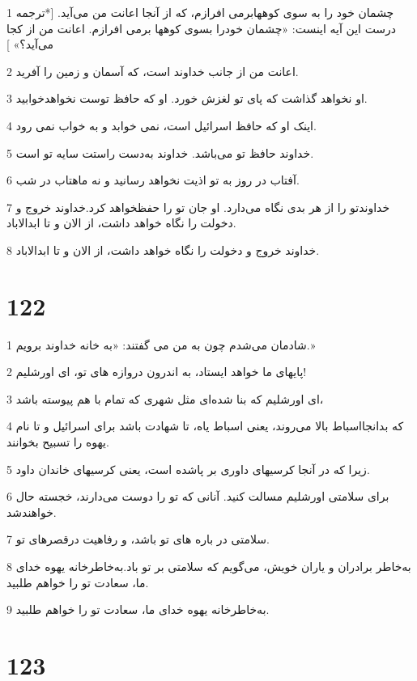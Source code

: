 \par 1 چشمان خود را به سوی کوههابرمی افرازم، که از آنجا اعانت من می‌آید. [*ترجمه درست این آیه اینست: «چشمان خودرا بسوی کوهها برمی افرازم. اعانت من از کجا می‌آید؟» ]
\par 2 اعانت من از جانب خداوند است، که آسمان و زمین را آفرید.
\par 3 او نخواهد گذاشت که پای تو لغزش خورد. او که حافظ توست نخواهدخوابید.
\par 4 اینک او که حافظ اسرائیل است، نمی خوابد و به خواب نمی رود.
\par 5 خداوند حافظ تو می‌باشد. خداوند به‌دست راستت سایه تو است. 
\par 6 آفتاب در روز به تو اذیت نخواهد رسانید و نه ماهتاب در شب.
\par 7 خداوندتو را از هر بدی نگاه می‌دارد. او جان تو را حفظخواهد کرد.خداوند خروج و دخولت را نگاه خواهد داشت، از الان و تا ابدالاباد.
\par 8 خداوند خروج و دخولت را نگاه خواهد داشت، از الان و تا ابدالاباد.
 
\chapter{122}

\par 1 شادمان می‌شدم چون به من می گفتند: «به خانه خداوند برویم.»
\par 2 پایهای ما خواهد ایستاد، به اندرون دروازه های تو، ای اورشلیم!
\par 3 ‌ای اورشلیم که بنا شده‌ای مثل شهری که تمام با هم پیوسته باشد،
\par 4 که بدانجااسباط بالا می‌روند، یعنی اسباط یاه، تا شهادت باشد برای اسرائیل و تا نام یهوه را تسبیح بخوانند.
\par 5 زیرا که در آنجا کرسیهای داوری بر پاشده است، یعنی کرسیهای خاندان داود.
\par 6 برای سلامتی اورشلیم مسالت کنید. آنانی که تو را دوست می‌دارند، خجسته حال خواهندشد.
\par 7 سلامتی در باره های تو باشد، و رفاهیت درقصرهای تو.
\par 8 به‌خاطر برادران و یاران خویش، می‌گویم که سلامتی بر تو باد.به‌خاطرخانه یهوه خدای ما، سعادت تو را خواهم طلبید.
\par 9 به‌خاطرخانه یهوه خدای ما، سعادت تو را خواهم طلبید.
 
\chapter{123}

